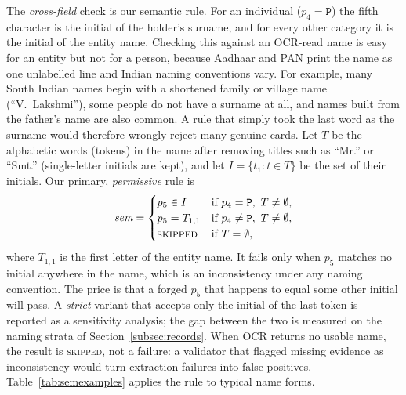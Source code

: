 \documentclass[VANCOUVER,Times1COL]{WileyNJDv5}
\begin{document}
The \emph{cross-field} check is our semantic rule. For an individual
($p_4=\texttt{P}$) the fifth character is the initial of the holder's
surname, and for every other category it is the initial of the entity
name\cite{itd-pan}. Checking this against an OCR-read name is easy for
an entity but not for a person, because Aadhaar and PAN print the name
as one unlabelled line and Indian naming conventions vary. For example, many South Indian names begin with a shortened family or village name (``V.~Lakshmi''), some people do not have a surname at all, and names built from the father's name are also common. A rule that simply took the last word as the surname would therefore wrongly reject many genuine cards. Let $T$ be the alphabetic words (tokens) in the name after removing titles such as ``Mr.'' or ``Smt.'' (single-letter initials are kept), and let $I = \{t_1 : t \in T\}$ be the set of their initials. Our primary,
\emph{permissive} rule is
\begin{equation}
\label{eq:sem}
\textit{sem} =
\begin{cases}
p_5 \in I        & \text{if } p_4=\texttt{P},\ T\neq\emptyset,\\
p_5 = T_{1,1}    & \text{if } p_4\neq\texttt{P},\ T\neq\emptyset,\\
\textsc{skipped} & \text{if } T=\emptyset,
\end{cases}
\end{equation}
where $T_{1,1}$ is the first letter of the entity name. It fails only
when $p_5$ matches no initial anywhere in the name, which is an
inconsistency under any naming convention. The price is that a forged
$p_5$ that happens to equal some other initial will pass. A
\emph{strict} variant that accepts only the initial of the last token is
reported as a sensitivity analysis; the gap between the two is measured
on the naming strata of Section~\ref{subsec:records}. When OCR returns
no usable name, the result is \textsc{skipped}, not a failure: a
validator that flagged missing evidence as inconsistency would turn
extraction failures into false positives.
Table~\ref{tab:semexamples} applies the rule to typical name forms.
\end{document}
